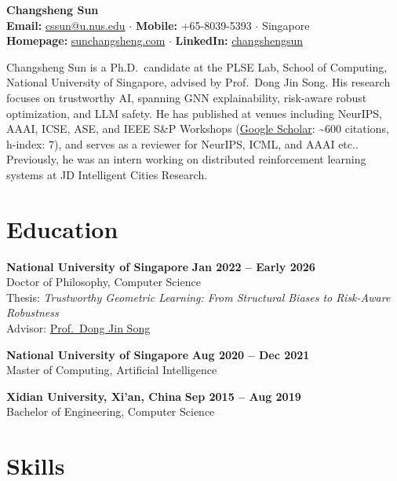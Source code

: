 \documentclass[11pt, a4paper]{article}
\newcommand{\education}[3]{%
    \textbf{#1} \hfill \textbf{#2} \\
    #3
    \vspace{0.3em}
}
\begin{document}
\begin{center}
    {\LARGE\bfseries Changsheng Sun} \\[0.3em]
    \textbf{Email:} \href{mailto:cssun@u.nus.edu}{cssun@u.nus.edu} \quad $\cdot$ \quad
    \textbf{Mobile:} +65-8039-5393 \quad $\cdot$ \quad
    Singapore \\[0.15em]
    \textbf{Homepage:} \href{https://sunchangsheng.com}{sunchangsheng.com} \quad $\cdot$ \quad
    \textbf{LinkedIn:} \href{https://linkedin.com/in/changshengsun}{changshengsun}
\end{center}
\vspace{0.35em}

Changsheng Sun is a Ph.D.\ candidate at the PLSE Lab, School of Computing, National University of Singapore, advised by Prof.\ Dong Jin Song. His research focuses on trustworthy AI, spanning GNN explainability, risk-aware robust optimization, and LLM safety. He has published at venues including NeurIPS, AAAI, ICSE, ASE, and IEEE S\&P Workshops (\href{https://scholar.google.com/citations?user=1M5_gpIAAAAJ}{Google Scholar}: \textasciitilde 600 citations, h-index: 7), and serves as a reviewer for NeurIPS, ICML, and AAAI etc.. Previously, he was an intern working on distributed reinforcement learning systems at JD Intelligent Cities Research.

\section{Education}

\education
    {National University of Singapore}
    {Jan 2022 -- Early 2026}
    {Doctor of Philosophy, Computer Science \\
     Thesis: \textit{Trustworthy Geometric Learning: From Structural Biases to Risk-Aware Robustness} \\
     Advisor: \href{https://www.comp.nus.edu.sg/~dongjs/}{Prof.\ Dong Jin Song}}

\education
    {National University of Singapore}
    {Aug 2020 -- Dec 2021}
    {Master of Computing, Artificial Intelligence}

\education
    {Xidian University, Xi'an, China}
    {Sep 2015 -- Aug 2019}
    {Bachelor of Engineering, Computer Science}

\section{Skills}
\end{document}
